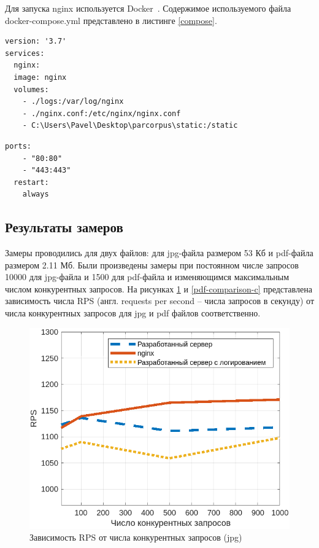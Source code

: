 Для запуска nginx используется Docker~\cite{docker}. Содержимое используемого файла docker-compose.yml представлено в листинге \ref{compose}.

\begin{lstlisting}[caption={Конфигурация docker-compose.yml}, label=compose]
version: '3.7'
services:  
  nginx:
  image: nginx
  volumes:
    - ./logs:/var/log/nginx
    - ./nginx.conf:/etc/nginx/nginx.conf
    - C:\Users\Pavel\Desktop\parcorpus\static:/static
\end{lstlisting}
    
\begin{lstlisting}[title={Окончание листинга \ref{compose}}, label=compose1, firstnumber=9]
  ports:
    - "80:80"
    - "443:443"
  restart:
    always
\end{lstlisting}

\subsection{Результаты замеров}

Замеры проводились для двух файлов: для jpg-файла размером 53 Кб и pdf-файла размером 2.11 Мб. Были произведены замеры при постоянном числе запросов 10000 для jpg-файла и 1500 для pdf-файла и изменяющимся максимальным числом конкурентных запросов. На рисунках \ref{jpg-comparison-c} и \ref{pdf-comparison-c} представлена зависимость числа RPS (англ. requests per second -- числа запросов в секунду) от числа конкурентных запросов для jpg и pdf файлов соответственно.

\captionsetup{singlelinecheck = false, justification=centering}
\begin{figure}[H]
	\centering
	\includegraphics[scale=1.1]{img/jpg-c.png}
	\caption{Зависимость RPS от числа конкурентных запросов (jpg)}
	\label{jpg-comparison-c}
\end{figure}

